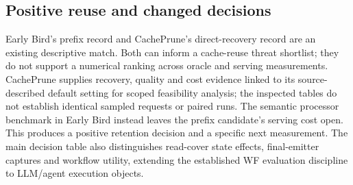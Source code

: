 \subsection{Positive reuse and changed decisions}
Early Bird's prefix record and CachePrune's direct-recovery record are an existing descriptive match. Both can inform a cache-reuse threat shortlist; they do not support a numerical ranking across oracle and serving measurements. CachePrune supplies recovery, quality and cost evidence linked to its source-described default setting for scoped feasibility analysis; the inspected tables do not establish identical sampled requests or paired runs. The semantic processor benchmark in Early Bird instead leaves the prefix candidate's serving cost open. This produces a positive retention decision and a specific next measurement. The main decision table also distinguishes read-cover state effects, final-emitter captures and workflow utility, extending the established WF evaluation discipline to LLM/agent execution objects.
